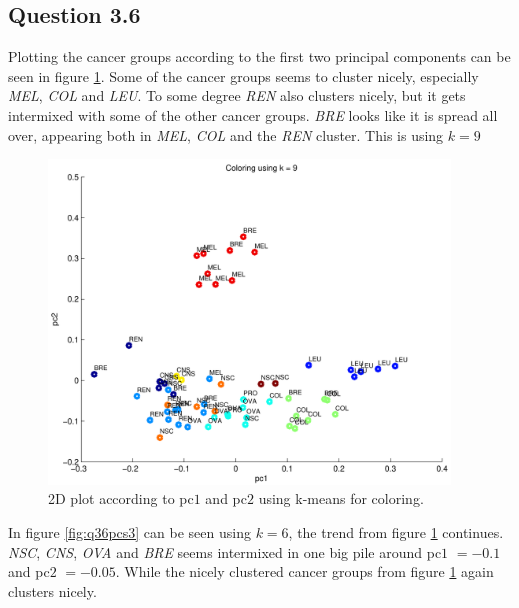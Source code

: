 \subsection*{Question 3.6}

Plotting the cancer groups according to the first two principal
components can be seen in figure \ref{fig:q36pcs2}. Some of the cancer
groups seems to cluster nicely, especially \emph{MEL}, \emph{COL} and
\emph{LEU}. To some degree \emph{REN} also clusters nicely, but it
gets intermixed with some of the other cancer groups. \emph{BRE} looks
like it is spread all over, appearing both in \emph{MEL}, \emph{COL}
and the \emph{REN} cluster. This is using $k = 9$

\begin{figure}[!htbp]
  \centering \includegraphics[width=0.95\textwidth]{./images/q36pcs2}
  \caption{2D plot according to pc$1$ and pc$2$ using k-means for
    coloring.}
  \label{fig:q36pcs2}
\end{figure}

\newpage

In figure \ref{fig:q36pcs3} can be seen using $k = 6$, the trend from
figure \ref{fig:q36pcs2} continues. \emph{NSC}, \emph{CNS}, \emph{OVA}
and \emph{BRE} seems intermixed in one big pile around pc$1$ $= -0.1$
and pc$2$ $= -0.05$. While the nicely clustered cancer groups from
figure \ref{fig:q36pcs2} again clusters nicely.

